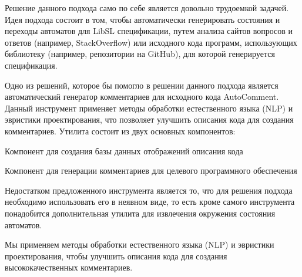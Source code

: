 Решение данного подхода само по себе является довольно трудоемкой задачей. Идея подхода состоит в том, чтобы автоматически генерировать  состояния и переходы автоматов для LibSL спецификации, путем анализа сайтов вопросов и ответов (например, StackOverflow) или исходного кода программ, использующих библиотеку (например, репозитории на GitHub), для которой генерируется спецификация.

Одно из решений, которое бы помогло в решении данного подхода является автоматический генератор комментариев для исходного кода AutoComment.
Данный инструмент применяет методы обработки естественного языка (NLP) и эвристики проектирования, что позволяет улучшить описания кода для создания комментариев.
Утилита состоит из двух основных компонентов:
%
\begin{itemize*}
\item Компонент для создания базы данных отображений описания кода
\item Компонент для генерации комментариев для целевого программного обеспечения
\end{itemize*}
%

Недостатком предложенного инструмента является то, что для решения подхода необходимо использовать его в неявном виде, то есть кроме самого инструмента понадобится дополнительная утилита для  извлечения окружения состояния автоматов.


Мы применяем методы обработки естественного языка (NLP) и эвристики проектирования, чтобы улучшить описания кода для создания высококачественных комментариев.